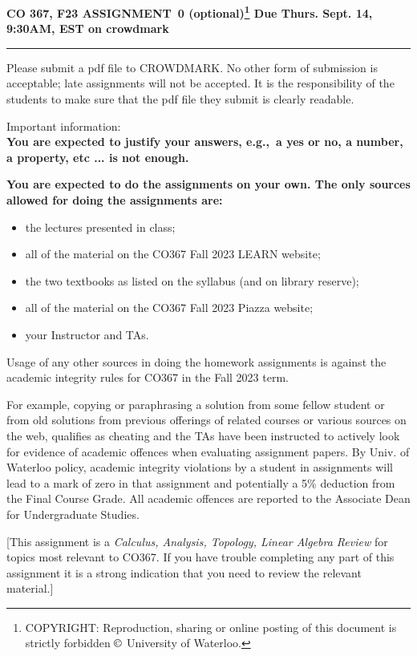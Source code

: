 \documentclass[12pt]{article}
\numberwithin{equation}{section}  %
\numberwithin{table}{section}
\numberwithin{algorithm}{section}
\theoremstyle{definition}
\newcommand{\<}{\langle}
\renewcommand{\>}{\rangle}
\begin{document}
{\bf CO 367, F23 \hfill  ASSIGNMENT~0 (optional)\footnote{
\tiny COPYRIGHT: Reproduction, sharing or online posting of this document is strictly
 forbidden $\copyright$ University of Waterloo.
}
 \hfill Due Thurs. Sept. 14, 9:30AM, EST on crowdmark}
\medskip

\hrule

Please submit a pdf file to CROWDMARK. No other form of submission is 
acceptable; late assignments will not be accepted. It is the 
responsibility of the students to make sure that the pdf file they 
submit is clearly readable.

\noindent
Important information: 
\\{\bf You are expected to justify your answers, e.g.,~a yes or no, a
number, a property, etc ... is not enough.} 
\\{\bf You are expected to do the assignments on 
your own. The only sources
allowed for doing the assignments are:
\begin{itemize}
\item
the lectures presented in class;
\item
all of the material on the CO367 Fall 2023 LEARN website;
\item
the two textbooks as listed on the syllabus (and on library reserve);
\item
 all of the material on the CO367 Fall 2023 Piazza website;
\item
 your Instructor and TAs.
\end{itemize}

Usage of any other sources in doing the homework assignments is against the
academic integrity rules for CO367 in the Fall 2023 term.
}

For example, copying or paraphrasing a solution from some fellow student or from old solutions from
previous offerings of related courses or various sources on the web, qualifies as cheating and the TAs have
been instructed to actively look for evidence of academic offences when evaluating assignment papers. By
Univ. of Waterloo policy, academic integrity violations by a student in assignments will lead to a mark of zero in that
assignment and potentially a 5\% deduction from the Final Course Grade. All academic offences are reported
to the Associate Dean for Undergraduate Studies.

[This assignment is a \emph{Calculus, Analysis, Topology, 
Linear Algebra Review} 
for topics
most relevant to CO367. If you have trouble completing
any part of this assignment it is a strong indication that you need to
review the relevant material.]
\end{document}

